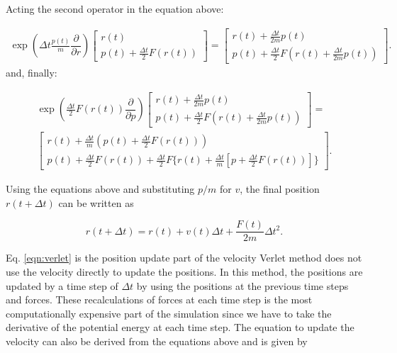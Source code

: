 Acting the second operator in the equation above:

\begin{equation}
\begin{aligned}
\exp \left( \Delta t \frac{p(t)}{m}\dfrac{\partial }{\partial r} \right)
\left[ \begin{array}{c} r(t) \\ p(t) + \frac{\Delta t}{2} F(r(t)) \end{array} \right] = 
\left[ \begin{array}{c} r(t) + \frac{\Delta t}{2m}p(t) \\ p(t) + \frac{\Delta t}{2} F(r(t) + \frac{\Delta t}{2m}p(t) ) \end{array} \right] .
\end{aligned}
\end{equation}
and, finally:

\begin{equation}
\begin{aligned}
\exp \left (\frac{\Delta t}{2} F(r(t)) \dfrac{\partial}{\partial p} \right)
\left[ \begin{array}{c} r(t) + \frac{\Delta t}{2m}p(t) \\ p(t) + \frac{\Delta t}{2} F(r(t) + \frac{\Delta t}{2m}p(t) ) \end{array} \right]= \\ 
\left[ \begin{array}{c} r(t) + \frac{\Delta t}{m} (p(t)+\frac{\Delta t}{2} F(r(t))) \\ p(t) + \frac{\Delta t}{2} F(r(t)) + \frac{\Delta t}{2} F\{r(t)+ \frac{\Delta t}{m} [p + \frac{\Delta t}{2}F(r(t))]\}\end{array} \right] .
\end{aligned}
\end{equation}

Using the equations above and substituting $p/m$ for $v$, the final position $r(t+\Delta t)$ can be written as

\begin{equation}
r(t+ \Delta t) = r(t) +v(t) \Delta t + \frac{F(t)}{2m} \Delta t^{2}.
\label{eqn:verlet}
\end{equation}

Eq.  \ref{eqn:verlet} is the position update part of the velocity Verlet method does not use the velocity directly to update the positions. In this method, the positions are updated by a time step of $\Delta t$ by using the positions at the previous time steps and forces. These recalculations of forces at each time step is the most computationally expensive part of the simulation since we have to take the derivative of the potential energy at each time step. The equation to update the velocity can also be derived from the equations above and is given by

